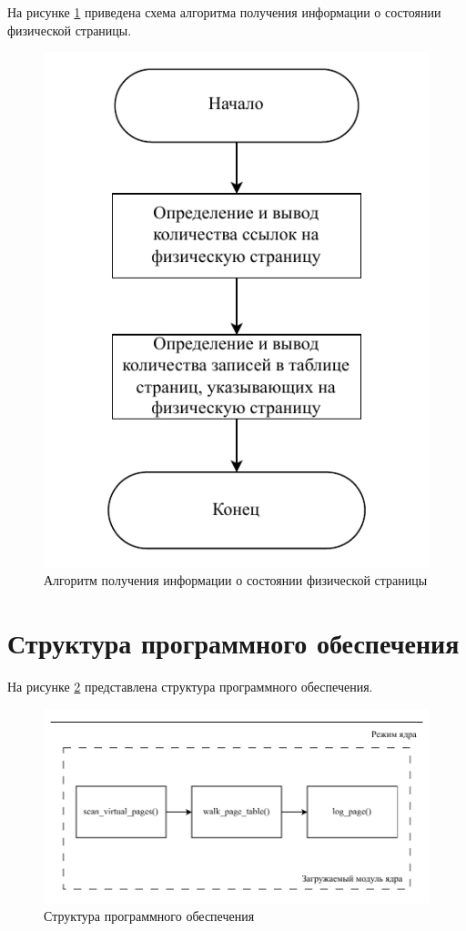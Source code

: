 На рисунке \ref{img:log-page} приведена схема алгоритма получения информации о состоянии физической страницы.

\begin{figure}[H]
	\begin{center}
		\includegraphics[scale=0.8]{inc/img/log_page.pdf}
	\end{center}
	\captionsetup{justification=centering}
	\caption{Алгоритм получения информации о состоянии физической страницы}
	\label{img:log-page}
\end{figure}

\section{Структура программного обеспечения}

На рисунке \ref{img:structure} представлена структура программного обеспечения.

\begin{figure}[H]
	\begin{center}
		\includegraphics[scale=0.8]{inc/img/structure.pdf}
	\end{center}
	\captionsetup{justification=centering}
	\caption{Структура программного обеспечения}
	\label{img:structure}
\end{figure}
